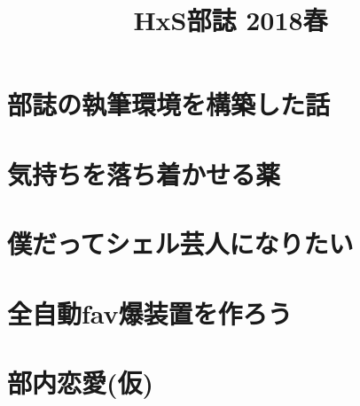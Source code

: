 \documentclass[10.5pt,a4paper]{jsbook}
\title{HxS部誌 2018春}
\date{}
\begin{document}
\maketitle
\tableofcontents

\chapter{部誌の執筆環境を構築した話}


\chapter{気持ちを落ち着かせる薬}


\chapter{僕だってシェル芸人になりたい}


\chapter{全自動fav爆装置を作ろう}


\chapter{部内恋愛(仮)}

\end{document}

